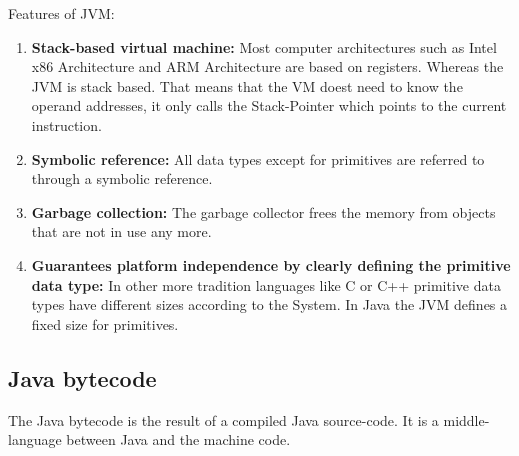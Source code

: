 Features of JVM:
\begin{enumerate}
\item \textbf{Stack-based virtual machine:} Most computer architectures such as Intel x86 Architecture and ARM Architecture are based on registers. Whereas the JVM is stack based.\cite{javaJVM} That means that the VM doest need to know the operand addresses, it only calls the Stack-Pointer which points to the current instruction. \cite{stackBased_vs_registerBased} 
\item \textbf{Symbolic reference:} All data types except for primitives are referred to through a symbolic reference.   
\item \textbf{Garbage collection:} The garbage collector frees the memory from objects that are not in use any more. \cite{javaGarbageCollector}  
\item \textbf{Guarantees platform independence by clearly defining the primitive data type:} In other more tradition languages like C or C++ primitive data types have different sizes according to the System. In Java the JVM defines a fixed size for primitives. 
\end{enumerate} \cite{javaJVM}

\subsection{Java bytecode}
The Java bytecode is the result of a compiled Java source-code. It is a middle-language between Java and the machine code. \cite{javaJVM}  

